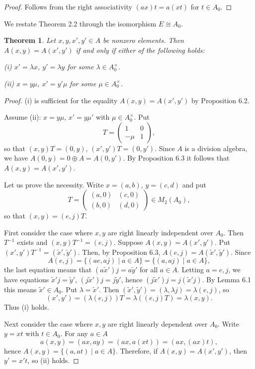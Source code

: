 \documentclass{article}
\newtheorem{thm}{Theorem}[section]
\begin{document}
\begin{proof}
Follows  from the right associativity $(ax)t=a(xt)$ for $t\in A_0$.
\end{proof}

We restate Theorem 2.2 through the isomorphism $E\cong A_0$.

\begin{thm}
Let $x,y,x',y'\in A$ be nonzero elements.
Then $A(x,y)=A(x',y')$ if and only if either of the following holds:

(i) $x'=\lambda x$, $y'=\lambda y$ for some $\lambda\in A_0^{\times}$.

(ii) $x=y\mu$, $x'=y'\mu$
 for some $\mu\in A_0^{\times}$.
 
\end{thm}


\begin{proof}
(i) is sufficient for the equality $A(x,y)=A(x',y')$ by Proposition 6.2.

Assume (ii):
$x=y\mu$, $x'=y\mu'$ with $\mu\in A_0^{\times}$.
Put
$$
T=\begin{pmatrix} 1 & 0 \\ -\mu & 1 \end{pmatrix},
$$
so that
$(x,y)T=(0,y)$, $(x',y')T=(0,y')$.
Since $A$ is a division algebra, we have $A(0,y)=0\oplus A=A(0,y')$.
By Proposition 6.3 it follows that $A(x,y)=A(x',y')$.




Let us prove the necessity.
Write $x=(a,b)$, $y=(c,d)$ and
put
$$
T=\begin{pmatrix} (a,0) & (c,0) \\
(b,0) & (d,0) \end{pmatrix}
\in M_2(A_0),
$$
so that
$(x,y)=(e,j)T$.


First consider the case where $x,y$ are right linearly independent over $A_0$.
Then $T^{-1}$ exists and
$(x,y)T^{-1}=(e,j)$.
Suppose $A(x,y)=A(x',y')$.
Put $(x',y')T^{-1}=(\tilde x',\tilde y')$.
Then, by Proposition 6.3,
$A(e,j)=A(\tilde x',\tilde y')$.
Since
$$
A(e,j)=\{(ae,aj)\mid a\in A\}=\{(a,aj)\mid a\in A\},
$$
the last equation  means that
$(a\tilde x')j=a\tilde y' $ for all $a\in A$.
Letting $a=e, j$, we have equations
$\tilde x'j=\tilde y'$, 
$(j\tilde x')j=j\tilde y'$, 
hence
$(j\tilde x')j=j(\tilde x' j)$.
By Lemma 6.1 this means   $\tilde x'\in A_0$.
Put $\lambda=\tilde x'$. Then
$(\tilde x',\tilde y')=(\lambda, \lambda j)=\lambda(e,j)$, so
$$
(x',y')=(\lambda(e,j))T=\lambda((e,j)T)=\lambda(x,y).
$$
Thus (i) holds.


Next consider the case where $x,y$ are right linearly dependent over $A_0$.
 Write $y=xt$ with $t\in A_0$.
For any $a\in A$
$$
a(x,y)=(ax,ay)=(ax,a(xt))=(ax,(ax)t),
$$
hence
$A(x,y)=\{(a,at)\mid a\in A\}$.
Therefore,
if $A(x,y)=A(x',y')$, then $y'=x't$, so (ii) holds.



\end{proof}
\end{document}
